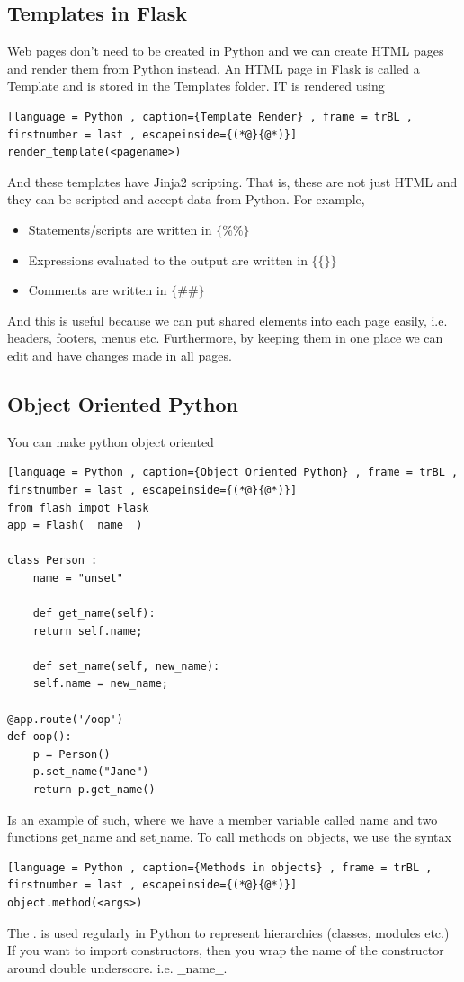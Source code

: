 \documentclass[a4paper]{article}
\theoremstyle{plain}
\theoremstyle{definition}
\theoremstyle{remark}
\begin{document}
\begin{flushleft}
\subsection{Templates in Flask}
Web pages don't need to be created in Python and we can create HTML pages and render them from Python instead. An HTML page in Flask is called a Template and is stored in the Templates folder. IT is rendered using
\begin{lstlisting}[language = Python , caption={Template Render} , frame = trBL , firstnumber = last , escapeinside={(*@}{@*)}]
render_template(<pagename>)
\end{lstlisting}
And these templates have Jinja2 scripting. That is, these are not just HTML and they can be scripted and accept data from Python. For example,
\begin{itemize}
	\item Statements/scripts are written in $\{ \% \% \}$
	\item Expressions evaluated to the output are written in  $\{\{\} \} $ 
	\item Comments are written in $\{\# \#\} $
\end{itemize}
And this is useful because we can put shared elements into each page easily, i.e. headers, footers, menus etc. Furthermore, by keeping them in one place we can edit and have changes made in all pages.
\subsection{Object Oriented Python}
You can make python object oriented
\begin{lstlisting}[language = Python , caption={Object Oriented Python} , frame = trBL , firstnumber = last , escapeinside={(*@}{@*)}]
from flash impot Flask
app = Flash(__name__)

class Person :
	name = "unset"
	
	def get_name(self):
	return self.name;

	def set_name(self, new_name):
	self.name = new_name;

@app.route('/oop')
def oop():
	p = Person()
	p.set_name("Jane")
	return p.get_name()
\end{lstlisting}
Is an example of such, where we have a member variable called name and two functions get$\_$name and set$\_$name. To call methods on objects, we use the syntax
\begin{lstlisting}[language = Python , caption={Methods in objects} , frame = trBL , firstnumber = last , escapeinside={(*@}{@*)}]
object.method(<args>)
\end{lstlisting}
The $.$ is used regularly in Python to represent hierarchies (classes, modules etc.) If you want to import constructors, then you wrap the name of the constructor around double underscore. i.e. $\_\_\text{name}\_\_$.


\end{flushleft}
\end{document}

